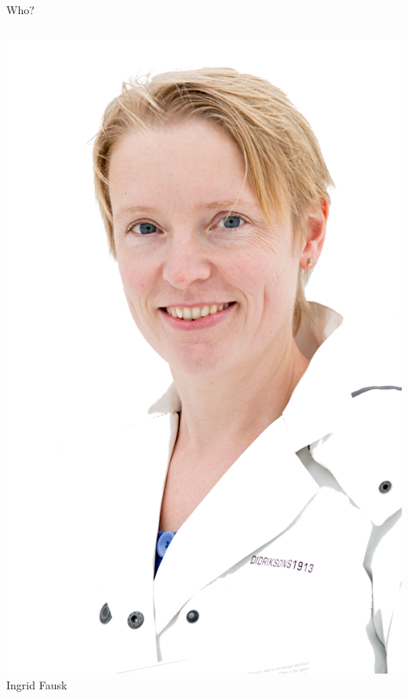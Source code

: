 \documentclass[ignorenonframetext,12pt,t]{beamer}
\begin{document}
\begin{frame}{Who?}
\begin{columns}[c]
    \begin{center}
      \includegraphics[width=\linewidth]{figure/ingrid} \\
      Ingrid Fausk
    \end{center}


\end{columns}
\end{frame}
\end{document}
